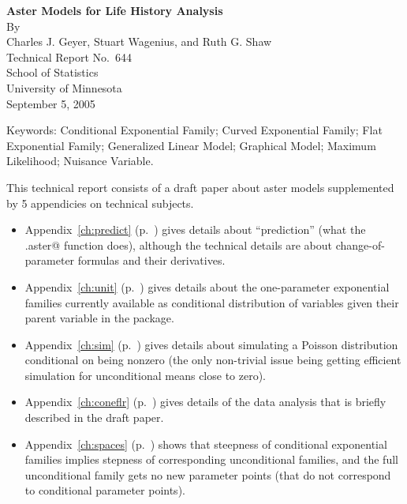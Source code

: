 \documentclass[11pt,twoside,notitlepage]{report}
\begin{document}
  \vspace*{0.9375in}
  \begin{center}
    {\bfseries Aster Models for Life History Analysis} \\
    By \\
    Charles J. Geyer, Stuart Wagenius, and Ruth G. Shaw \\
    Technical Report No.~644 \\
    School of Statistics \\
    University of Minnesota \\
    September 5, 2005
  \end{center}
  \thispagestyle{empty}
  \cleardoublepage
  \setcounter{page}{1}
  \thispagestyle{empty}



\vspace{0.2in}
\sloppypar
\noindent
Keywords:
    Conditional Exponential Family;
    Curved Exponential Family;
    Flat Exponential Family;
    Generalized Linear Model;
    Graphical Model;
    Maximum Likelihood;
    Nuisance Variable.

\vspace{0.2in}
\sloppypar
This technical report consists of a draft paper about aster models
supplemented by 5 appendicies on technical subjects.
\begin{itemize}
\item Appendix~\ref{ch:predict} (p.~\pageref{ch:predict})
gives details about ``prediction''
(what the \verb@predict.aster@ function does), although the technical
details are about change-of-parameter formulas and their derivatives.
\item Appendix~\ref{ch:unit} (p.~\pageref{ch:unit})
gives details about the one-parameter exponential families currently
available as conditional distribution of variables given their parent variable
in the \verb@aster@ package.
\item Appendix~\ref{ch:sim} (p.~\pageref{ch:sim})
gives details about simulating a Poisson distribution conditional on being
nonzero (the only non-trivial issue being getting efficient simulation for
unconditional means close to zero).
\item Appendix~\ref{ch:coneflr} (p.~\pageref{ch:coneflr})
gives details of the data analysis that is briefly described
in the draft paper.
\item Appendix~\ref{ch:spaces} (p.~\pageref{ch:spaces})
shows that steepness of conditional exponential families
implies stepness of corresponding unconditional families,
and the full unconditional family gets no new parameter points (that do not
correspond to conditional parameter points).
\end{itemize}
\end{document}
